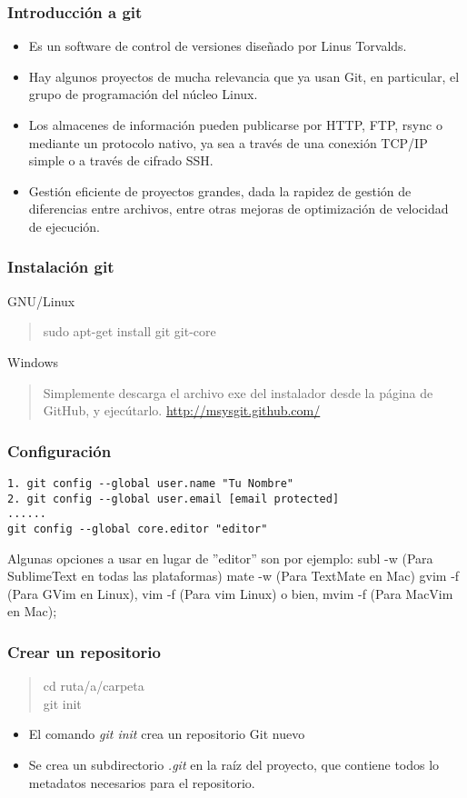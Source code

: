 \documentclass{beamer}
\begin{document}
\begin{frame}
\frametitle{Introducción a git}
\begin{itemize}[<+->]
\item Es un software de control de versiones diseñado por Linus Torvalds.
\item  Hay algunos proyectos de mucha relevancia que ya usan Git, en particular, el grupo de programación del núcleo Linux.
\item Los almacenes de información pueden publicarse por HTTP, FTP, rsync o mediante un protocolo nativo, ya sea a través de una conexión TCP/IP simple o a través de cifrado SSH. 
\item Gestión eficiente de proyectos grandes, dada la rapidez de gestión de diferencias entre archivos, entre otras mejoras de optimización de velocidad de ejecución.

\end{itemize}
\end{frame}

\begin{frame}
\frametitle{Instalación git}
\begin{block}{GNU/Linux}
\begin{verse}
sudo apt-get install git git-core
\end{verse}
\end{block}
\pause
\begin{block}{Windows}
\begin{verse}
Simplemente descarga el archivo exe del instalador desde la página de GitHub, y ejecútarlo. \url{http://msysgit.github.com/}
\end{verse}
\end{block}
\end{frame}

\begin{frame}[fragile]
\frametitle{Configuración} 
\begin{verbatim}
1. git config --global user.name "Tu Nombre"
2. git config --global user.email [email protected]
......
git config --global core.editor "editor" 
\end{verbatim}
\pause
Algunas opciones a usar en lugar de ''editor'' son por ejemplo: subl -w (Para SublimeText en todas las plataformas) mate -w (Para TextMate en Mac) gvim -f  (Para GVim en Linux), vim -f (Para vim Linux) o bien, mvim -f (Para MacVim en Mac);
\end{frame}

\begin{frame}
\frametitle{Crear un repositorio} 
\begin{verse}
cd ruta/a/carpeta\\
git init 
\end{verse}
\pause
\begin{itemize}[<+->]
\item El comando \emph{git init} crea un repositorio Git nuevo
\item Se crea un subdirectorio \emph{.git} en la raíz del proyecto, que contiene todos lo metadatos necesarios para el repositorio.
\end{itemize}
\end{frame}
\end{document}
